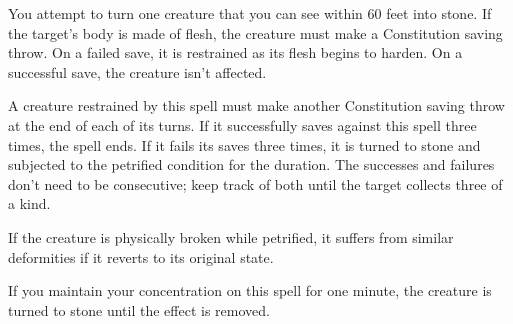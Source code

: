 You attempt to turn one creature that you can see within 60 feet into stone. If the target's body is made of flesh, the creature must make a Constitution saving throw. On a failed save, it is restrained as its flesh begins to harden. On a successful save, the creature isn't affected.

A creature restrained by this spell must make another Constitution saving throw at the end of each of its turns. If it successfully saves against this spell three times, the spell ends. If it fails its saves three times, it is turned to stone and subjected to the petrified condition for the duration. The successes and failures don't need to be consecutive; keep track of both until the target collects three of a kind.

If the creature is physically broken while petrified, it suffers from similar deformities if it reverts to its original state.

If you maintain your concentration on this spell for one minute, the creature is turned to stone until the effect is removed.











